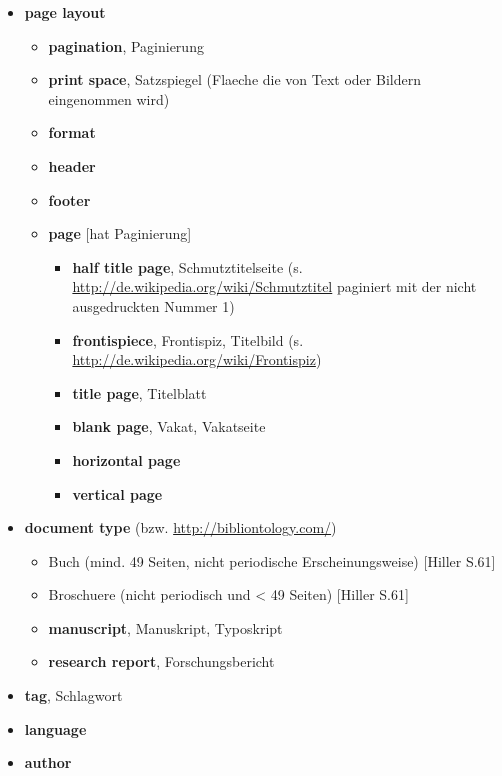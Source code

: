   \begin{itemize}
  \itemsep1pt\parskip0pt
  \item
    \textbf{page layout}

    \begin{itemize}
    \itemsep1pt\parskip0pt
    \item
      \textbf{pagination}, Paginierung
    \item
      \textbf{print space}, Satzspiegel (Flaeche die von Text oder
      Bildern eingenommen wird)
    \item
      \textbf{format}
    \item
      \textbf{header}
    \item
      \textbf{footer}
    \item
      \textbf{page} {[}hat Paginierung{]}

      \begin{itemize}
      \itemsep1pt\parskip0pt
      \item
        \textbf{half title page}, Schmutztitelseite (s.
        \url{http://de.wikipedia.org/wiki/Schmutztitel} paginiert mit
        der nicht ausgedruckten Nummer 1)
      \item
        \textbf{frontispiece}, Frontispiz, Titelbild (s.
        \url{http://de.wikipedia.org/wiki/Frontispiz})
      \item
        \textbf{title page}, Titelblatt
      \item
        \textbf{blank page}, Vakat, Vakatseite
      \item
        \textbf{horizontal page}
      \item
        \textbf{vertical page}
      \end{itemize}
    \end{itemize}
  \item
    \textbf{document type} (bzw. \url{http://bibliontology.com/})

    \begin{itemize}
    \itemsep1pt\parskip0pt
    \item
      Buch (mind. 49 Seiten, nicht periodische Erscheinungsweise)
      {[}Hiller S.61{]}
    \item
      Broschuere (nicht periodisch und \textless{} 49 Seiten) {[}Hiller
      S.61{]}
    \item
      \textbf{manuscript}, Manuskript, Typoskript
    \item
      \textbf{research report}, Forschungsbericht
    \end{itemize}
  \item
    \textbf{tag}, Schlagwort
  \item
    \textbf{language}
  \item
    \textbf{author}
  \end{itemize}